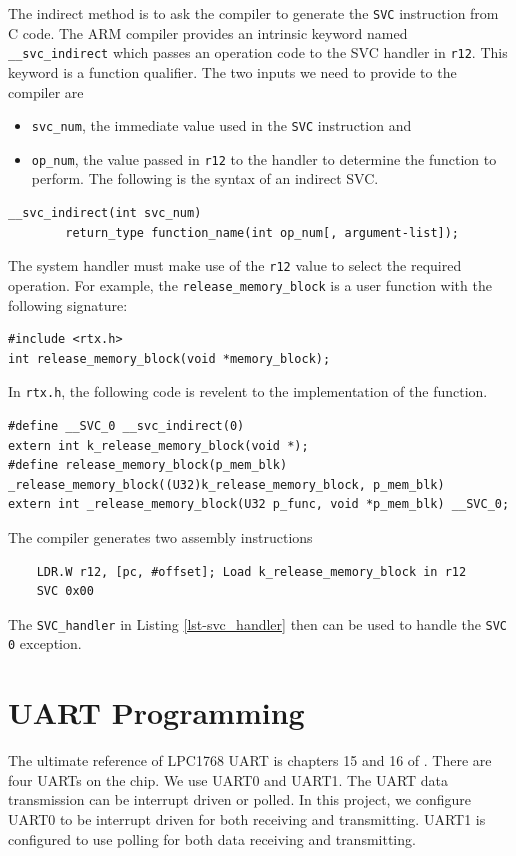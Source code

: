 The indirect method is to ask the compiler to generate the \verb+SVC+ instruction from C code. The ARM compiler provides an intrinsic keyword named \verb+__svc_indirect+ which passes an operation code to the SVC handler in \verb+r12+\cite{arm.rvct.comp.ref}. This keyword is a function qualifier. The two inputs we need to provide to the compiler are
\begin{itemize}
\item \verb+svc_num+, the immediate value used in the \verb+SVC+ instruction and
\item \verb+op_num+, the value passed in \verb+r12+ to the handler to determine the function to perform. The following is the syntax of an indirect SVC. 
\end{itemize}
\begin{lstlisting}
__svc_indirect(int svc_num)
        return_type function_name(int op_num[, argument-list]);
\end{lstlisting}
The system handler must make use of the \verb+r12+ value to select the required operation. For example, the \verb+release_memory_block+ is a user function with the following signature:
\begin{lstlisting}
#include <rtx.h>
int release_memory_block(void *memory_block);
\end{lstlisting}
In \verb+rtx.h+, the following code is revelent to the implementation of the function.
\begin{lstlisting}
#define __SVC_0 __svc_indirect(0)
extern int k_release_memory_block(void *);
#define release_memory_block(p_mem_blk) _release_memory_block((U32)k_release_memory_block, p_mem_blk)
extern int _release_memory_block(U32 p_func, void *p_mem_blk) __SVC_0;
\end{lstlisting}
The compiler generates two assembly instructions
\begin{lstlisting}
    LDR.W r12, [pc, #offset]; Load k_release_memory_block in r12
    SVC 0x00
\end{lstlisting}
The \verb+SVC_handler+ in Listing \ref{lst-svc_handler} then can be used to handle the \verb+SVC 0+ exception.

\section{UART Programming}
\label{sec_uart_programming}

The ultimate reference of LPC1768 UART is chapters 15 and 16 of \cite{nxp.lpc17xx.manual}. There are four UARTs on the chip. We use UART0 and UART1. The UART data transmission can be interrupt driven or polled. In this project, we configure UART0 to be interrupt driven for both receiving and transmitting. UART1 is configured to use polling for both data receiving and transmitting. 

